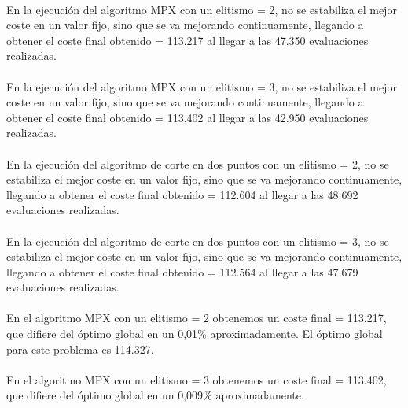 	\paragraph{}En la ejecución del algoritmo MPX con un elitismo = 2, no se estabiliza el mejor coste en un valor fijo, sino que se va mejorando continuamente, llegando a obtener el coste final obtenido = 113.217 al llegar a las 47.350 evaluaciones realizadas.
	
	\paragraph{}En la ejecución del algoritmo MPX con un elitismo = 3, no se estabiliza el mejor coste en un valor fijo, sino que se va mejorando continuamente, llegando a obtener el coste final obtenido = 113.402 al llegar a las 42.950 evaluaciones realizadas.

	\paragraph{}En la ejecución del algoritmo de corte en dos puntos con un elitismo = 2, no se estabiliza el mejor coste en un valor fijo, sino que se va mejorando continuamente, llegando a obtener el coste final obtenido = 112.604 al llegar a las 48.692 evaluaciones realizadas.
	
	\paragraph{}En la ejecución del algoritmo de corte en dos puntos con un elitismo = 3, no se estabiliza el mejor coste en un valor fijo, sino que se va mejorando continuamente, llegando a obtener el coste final obtenido = 112.564 al llegar a las 47.679 evaluaciones realizadas.
	
	\paragraph{}En el algoritmo MPX con un elitismo = 2 obtenemos un coste final = 113.217, que difiere del óptimo global en un 0,01\% aproximadamente. El óptimo global para este problema es 114.327.
	
	\paragraph{}En el algoritmo MPX con un elitismo = 3 obtenemos un coste final = 113.402, que difiere del óptimo global en un 0,009\% aproximadamente.
	
